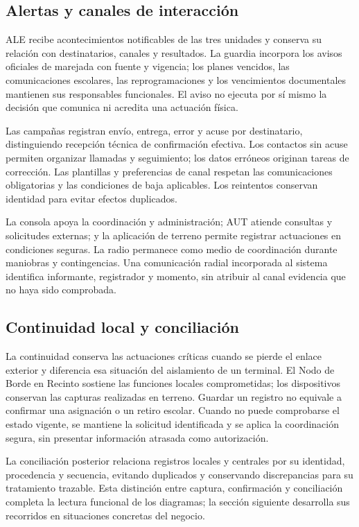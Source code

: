 \subsection{Alertas y canales de interacción}

ALE recibe acontecimientos notificables de las tres unidades y
conserva su relación con destinatarios, canales y resultados.
La guardia incorpora los avisos oficiales de marejada con fuente y
vigencia; los planes vencidos, las comunicaciones escolares,
las reprogramaciones y los vencimientos documentales mantienen sus
responsables funcionales. El aviso no ejecuta por sí mismo la decisión
que comunica ni acredita una actuación física.

Las campañas registran envío, entrega, error y acuse por destinatario,
distinguiendo recepción técnica de confirmación efectiva.
Los contactos sin acuse permiten organizar llamadas y seguimiento;
los datos erróneos originan tareas de corrección.
Las plantillas y preferencias de canal respetan las comunicaciones
obligatorias y las condiciones de baja aplicables.
Los reintentos conservan identidad para evitar efectos duplicados.

La consola apoya la coordinación y administración; AUT atiende
consultas y solicitudes externas; y la aplicación de terreno permite
registrar actuaciones en condiciones seguras.
La radio permanece como medio de coordinación durante maniobras
y contingencias. Una comunicación radial incorporada al sistema
identifica informante, registrador y momento, sin atribuir al canal
evidencia que no haya sido comprobada.


\subsection{Continuidad local y conciliación}

La continuidad conserva las actuaciones críticas cuando se pierde
el enlace exterior y diferencia esa situación del aislamiento
de un terminal. El Nodo de Borde en Recinto sostiene las funciones
locales comprometidas; los dispositivos conservan las capturas
realizadas en terreno. Guardar un registro no equivale
a confirmar una asignación o un retiro escolar.
Cuando no puede comprobarse el estado vigente, se mantiene
la solicitud identificada y se aplica la coordinación segura,
sin presentar información atrasada como autorización.

La conciliación posterior relaciona registros locales y centrales
por su identidad, procedencia y secuencia, evitando duplicados
y conservando discrepancias para su tratamiento trazable.
Esta distinción entre captura, confirmación y conciliación
completa la lectura funcional de los diagramas;
la sección siguiente desarrolla sus recorridos
en situaciones concretas del negocio.



